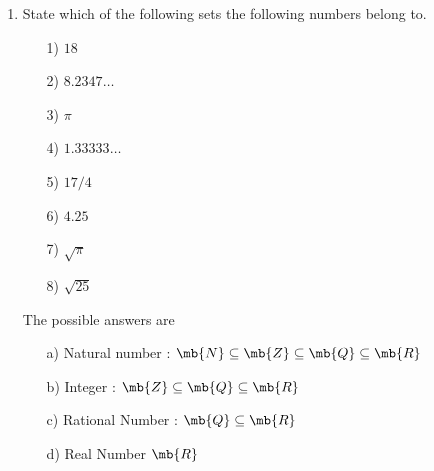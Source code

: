 \begin{enumerate}
	\item State which of the following sets the following numbers belong to. 
	\begin{multicols}{4}
		\begin{itemize}
			\item[1)] $18$
			\item[2)] $8.2347\ldots$
			\item[3)] $\pi$
			\item[4)] $1.33333\ldots$
			\item[5)] $17/4$
			\item[6)] $4.25$
			\item[7)] $\sqrt{\pi}$
			\item[8)] $\sqrt{25}$
		\end{itemize}
	\end{multicols}
	\bigskip
	The possible answers are
	
	\begin{itemize}
		\item[a)] Natural number : $\mb{N} \subseteq \mb{Z } \subseteq \mb{Q} \subseteq \mb{R}$
		\item[b)] Integer : $ \mb{Z } \subseteq \mb{Q} \subseteq \mb{R}$
		\item[c)] Rational Number : $ \mb{Q} \subseteq \mb{R}$
		\item[d)] Real Number $\mb{R}$
		
	\end{itemize}
	
\end{enumerate}






